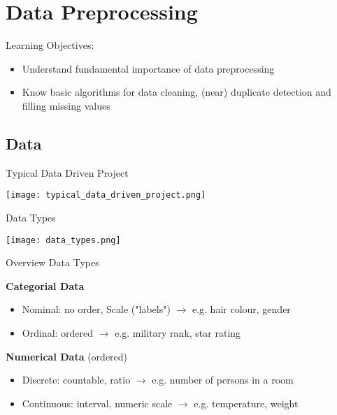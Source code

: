 \section{Data Preprocessing}

\begin{remark}
    Learning Objectives:
    \begin{itemize}
        \item Understand fundamental importance of data preprocessing
        \item Know basic algorithms for data cleaning, (near) duplicate detection and filling missing values
    \end{itemize}
\end{remark}

\subsection{Data}


\begin{concept}{Typical Data Driven Project}

    \texttt{[image: typical\_data\_driven\_project.png]}
\end{concept}



\begin{theorem}{Data Types}
    
    \texttt{[image: data\_types.png]}
\end{theorem}

\begin{concept}{Overview Data Types}

    \textbf{Categorial Data}
    \begin{itemize}
        \item Nominal: no order, Scale ("labels") $\rightarrow$ e.g. hair colour, gender
        \item Ordinal: ordered $\rightarrow$ e.g. military rank, star rating
    \end{itemize}

    \textbf{Numerical Data} (ordered)
    \begin{itemize}
        \item Discrete: countable, ratio $\rightarrow$ e.g. number of persons in a room
        \item Continuous: interval, numeric scale $\rightarrow$ e.g. temperature, weight
    \end{itemize}
\end{concept}

